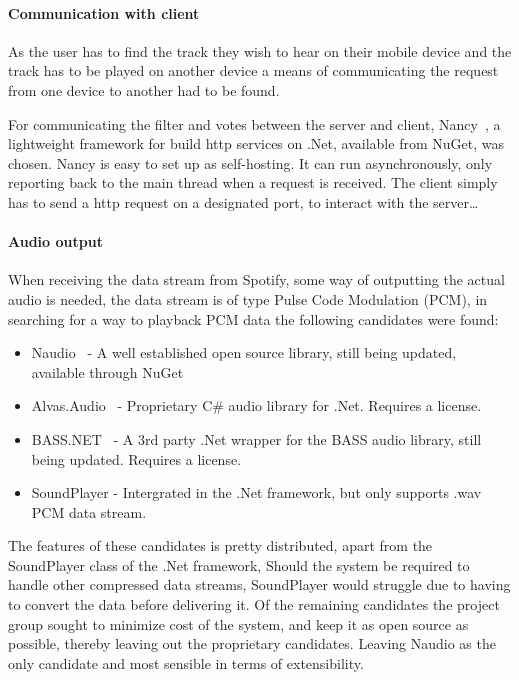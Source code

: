 	\paragraph{Communication with client}
	As the user has to find the track they wish to hear on their mobile device and the track has to be played on another device a means of communicating the request from one device to another had to be found.

	For communicating the filter and votes between the server and client, Nancy~\cite{nancy}, a lightweight framework for build http services on .Net, available from NuGet, was chosen. Nancy is easy to set up as self-hosting. It can run asynchronously, only reporting back to the main thread when a request is received. The client simply has to send a http request on a designated port, to interact with the server\dots {}

	\paragraph{Audio output}
	When receiving the data stream from Spotify, some way of outputting the actual audio is needed, the data stream is of type Pulse Code Modulation (PCM), in searching for a way to playback PCM data the following candidates were found:
\begin{itemize}
	\item Naudio~\cite{naudio} - A well established open source library, still being updated, available through NuGet
	\item Alvas.Audio~\cite{alvas} - Proprietary C\# audio library for .Net. Requires a license.
	\item BASS.NET~\cite{bass} - A 3rd party .Net wrapper for the BASS audio library, still being updated. Requires a license.
	\item SoundPlayer - Intergrated in the .Net framework, but only supports .wav PCM data stream.
\end{itemize}

	The features of these candidates is pretty distributed, apart from the SoundPlayer class of the .Net framework, Should the system be required to handle other compressed data streams, SoundPlayer would struggle due to having to convert the data before delivering it. Of the remaining candidates the project group sought to minimize cost of the system, and keep it as open source as possible, thereby leaving out the proprietary candidates. Leaving Naudio as the only candidate and most sensible in terms of extensibility.